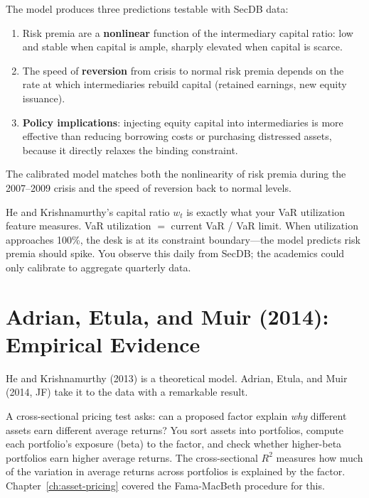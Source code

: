 \begin{keyresult}
The model produces three predictions testable with SecDB data:
\begin{enumerate}[nosep]
  \item Risk premia are a \textbf{nonlinear} function of the intermediary capital ratio: low and stable when capital is ample, sharply elevated when capital is scarce.
  \item The speed of \textbf{reversion} from crisis to normal risk premia depends on the rate at which intermediaries rebuild capital (retained earnings, new equity issuance).
  \item \textbf{Policy implications}: injecting equity capital into intermediaries is more effective than reducing borrowing costs or purchasing distressed assets, because it directly relaxes the binding constraint.
\end{enumerate}
The calibrated model matches both the nonlinearity of risk premia during the 2007--2009 crisis and the speed of reversion back to normal levels.
\end{keyresult}

\begin{projectconnection}
He and Krishnamurthy's capital ratio $w_t$ is exactly what your VaR utilization feature measures. VaR utilization $=$ current VaR / VaR limit. When utilization approaches 100\%, the desk is at its constraint boundary---the model predicts risk premia should spike. You observe this daily from SecDB; the academics could only calibrate to aggregate quarterly data.
\end{projectconnection}

\section{Adrian, Etula, and Muir (2014): Empirical Evidence}
\label{sec:adrian-etula-muir}

He and Krishnamurthy (2013) is a theoretical model. Adrian, Etula, and Muir (2014, JF) take it to the data with a remarkable result.

\begin{prereq}
A cross-sectional pricing test asks: can a proposed factor explain \emph{why} different assets earn different average returns? You sort assets into portfolios, compute each portfolio's exposure (beta) to the factor, and check whether higher-beta portfolios earn higher average returns. The cross-sectional $R^2$ measures how much of the variation in average returns across portfolios is explained by the factor. Chapter~\ref{ch:asset-pricing} covered the Fama-MacBeth procedure for this.
\end{prereq}

